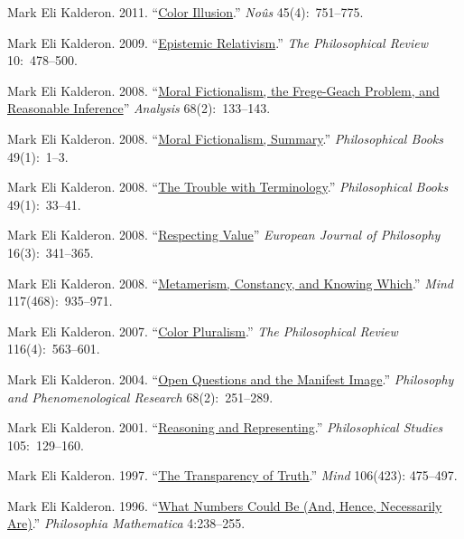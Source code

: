 \documentclass[11pt]{article}
\begin{document}
\ind Mark Eli Kalderon. 2011. ``\href{http://onlinelibrary.wiley.com/doi/10.1111/j.1468-0068.2010.00781.x/pdf}{Color Illusion}.''
 \emph{No{\^u}s} 45(4):~751--775.

\ind Mark Eli Kalderon. 2009. ``\href{http://philreview.dukejournals.org/content/118/2/225.full.pdf+html}{Epistemic Relativism}.'' \emph{The Philosophical Review} 10:~478--500. 

\ind Mark Eli Kalderon. 2008. ``\href{http://onlinelibrary.wiley.com/doi/10.1111/j.1467-8284.2007.00728.x/full}{Moral Fictionalism, the Frege-Geach Problem, and Reasonable Inference}'' \emph{Analysis} 68(2):~133--143. 


\ind Mark Eli Kalderon. 2008. ``\href{http://onlinelibrary.wiley.com/doi/10.1111/j.1468-0149.2008.454_1.x/pdf}{Moral Fictionalism, Summary}.'' \emph{Philosophical Books} 49(1):~1--3.


\ind Mark Eli Kalderon. 2008.  ``\href{http://onlinelibrary.wiley.com/doi/10.1111/j.1468-0149.2008.454_5.x/abstract}{The Trouble with Terminology}.'' \emph{Philosophical Books} 49(1):~33--41.


\ind Mark Eli Kalderon. 2008. ``\href{http://onlinelibrary.wiley.com/doi/10.1111/j.1468-0378.2008.00324.x/pdf}{Respecting Value}''  \emph{European Journal of Philosophy}
16(3):~341--365.


\ind  Mark Eli Kalderon. 2008.  ``\href{http://mind.oxfordjournals.org/content/117/468/935.full.pdf+html}{Metamerism, Constancy, and Knowing Which}.'' \emph{Mind} 117(468):~935--971. 

\ind  Mark Eli Kalderon. 2007.  ``\href{http://philreview.dukejournals.org/content/116/4/563.full.pdf+html}{Color Pluralism}.'' \emph{The Philosophical Review} 116(4):~563--601.

\ind  Mark Eli Kalderon. 2004.  ``\href{http://onlinelibrary.wiley.com/doi/10.1111/j.1933-1592.2004.tb00341.x/pdf}{Open Questions and the Manifest Image}.'' \emph{Philosophy and Phenomenological Research} 68(2):~251--289.

\ind  Mark Eli Kalderon. 2001.  ``\href{http://www.springerlink.com/content/u5286534982v0317/fulltext.pdf}{Reasoning and Representing}.'' \emph{Philosophical Studies} 105:~129--160.

\ind Mark Eli Kalderon. 1997.
``\href{http://mind.oxfordjournals.org/content/106/423/475.full.pdf}{The Transparency of Truth}.'' \emph{Mind} 106(423): 475--497.

\ind Mark Eli Kalderon. 1996.
``\href{http://philmat.oxfordjournals.org/content/4/3/238.full.pdf}{What Numbers Could Be (And, Hence, Necessarily Are)}.'' \emph{Philosophia Mathematica} 4:238--255.
\end{document}
